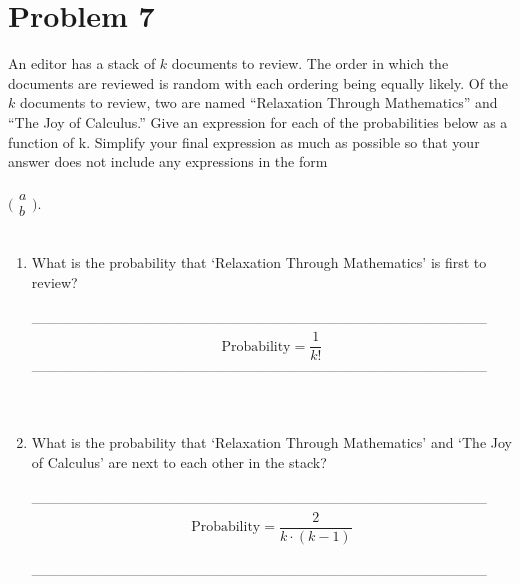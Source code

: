 \documentclass{amsart}
\theoremstyle{definition}
\theoremstyle{Exercise}
\theoremstyle{remark}
\theoremstyle{rule}
\numberwithin{equation}{section}
\begin{document}
\section*{Problem 7}
An editor has a stack of $k$ documents to review.  The order in which the documents are reviewed is random with each ordering being equally likely. Of the $k$ documents to review, two are named ``Relaxation Through Mathematics'' and ``The Joy of Calculus.'' Give an expression for each of the probabilities below as a function of k. Simplify your final expression as much as possible so that your answer does not include any expressions in the form\\\\
$
\Big(
 \begin{array}{c}
 a\\
 b
    \end{array}
    \Big)
$.
\\\\
 \begin{enumerate}[label=(\alph*)]
\item What is the probability that `Relaxation Through Mathematics' is first to review?\\\\
--------------------------------------------------------------------------------------------------\\
\[\text{Probability} = \frac{1}{k!}\]
--------------------------------------------------------------------------------------------------\\
\\\\
\item What is the probability that `Relaxation Through Mathematics' and `The Joy of Calculus' are next to each other in the stack?\\\\
--------------------------------------------------------------------------------------------------\\
\[\text{Probability} = \frac{2}{k \cdot (k - 1)}\]\\
--------------------------------------------------------------------------------------------------\\
\\\\
\end{enumerate}
\end{document}
